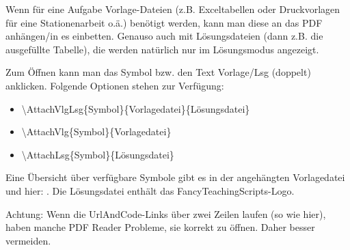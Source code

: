 {

    Wenn für eine Aufgabe Vorlage-Dateien (z.B. Exceltabellen oder Druckvorlagen für eine Stationenarbeit o.ä.) benötigt werden, kann man diese an das PDF anhängen/in es einbetten.
    Genauso auch mit Lösungsdateien (dann z.B. die ausgefüllte Tabelle), die werden natürlich nur im Lösungsmodus angezeigt.

    Zum Öffnen kann man das Symbol bzw. den Text Vorlage/Lsg (doppelt) anklicken. Folgende Optionen stehen zur Verfügung:

    \begin{itemize}
        \item \textbackslash{}AttachVlgLsg\{Symbol\}\{Vorlagedatei\}\{Lösungsdatei\}
        \item \textbackslash{}AttachVlg\{Symbol\}\{Vorlagedatei\}
        \item \textbackslash{}AttachLsg\{Symbol\}\{Lösungsdatei\}
    \end{itemize}

    Eine Übersicht über verfügbare Symbole gibt es in der angehängten Vorlagedatei und hier: .
    Die Lösungsdatei enthält das FancyTeachingScripts-Logo.    
    
    Achtung: Wenn die UrlAndCode-Links über zwei Zeilen laufen (so wie hier), haben manche PDF Reader Probleme, sie korrekt zu öffnen. Daher besser vermeiden.
    
}




